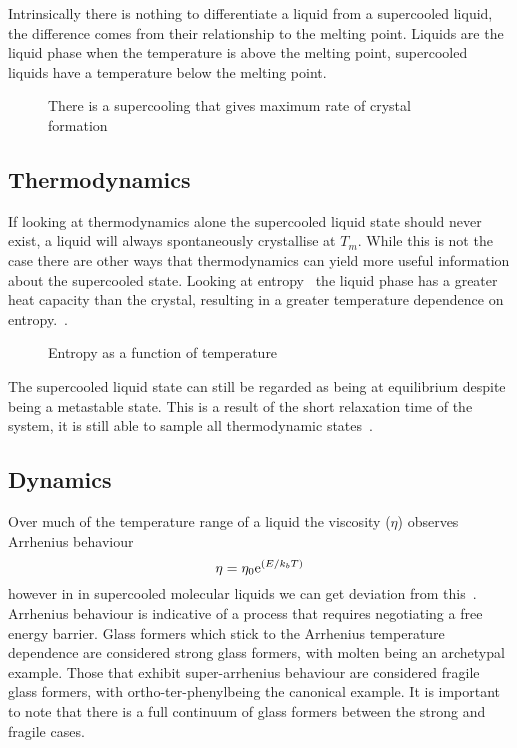 Intrinsically there is nothing to differentiate a liquid from a supercooled liquid, the difference comes from their relationship to the melting point. Liquids are the liquid phase when the temperature is above the melting point, supercooled liquids have a temperature below the melting point.

\begin{figure}
    \caption{There is a supercooling that gives maximum rate of crystal formation}
    \label{fig:supercool crys}
\end{figure}


\subsection{Thermodynamics}

If looking at thermodynamics alone the supercooled liquid state should never exist, a liquid will always spontaneously crystallise at $T_m$. While this is not the case there are other ways that thermodynamics can yield more useful information about the supercooled state. Looking at entropy~ the liquid phase has a greater heat capacity than the crystal, resulting in a greater temperature dependence on entropy.~\cite{debenedetti:01}.

\begin{figure}
    \caption{Entropy as a function of temperature}
    \label{fig:entropy}
\end{figure}

The supercooled liquid state can still be regarded as being at equilibrium despite being a metastable state. This is a result of the short relaxation time of the system, it is still able to sample all thermodynamic states~\cite{cavagna:09}.

\subsection{Dynamics}

Over much of the temperature range of a liquid the viscosity ($\eta$) observes Arrhenius behaviour
\begin{equation}
    \eta = \eta_0 \text{e}^{(E/k_bT)}
\end{equation}
however in in supercooled molecular liquids we can get deviation from this~. Arrhenius behaviour is indicative of a process that requires negotiating a free energy barrier.  Glass formers which stick to the Arrhenius temperature dependence are considered strong glass formers, with molten  being an archetypal example. Those that exhibit super-arrhenius behaviour are considered fragile glass formers, with ortho-ter-phenyl\tocheck being the canonical example. It is important to note that there is a full continuum of glass formers between the strong and fragile cases.

